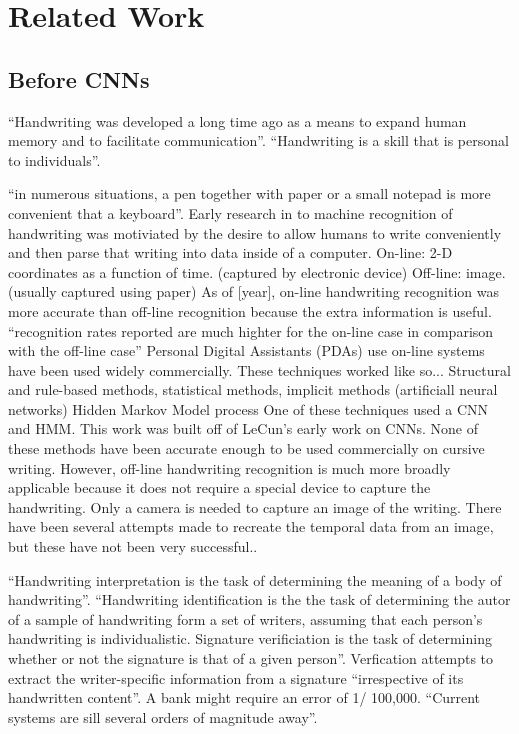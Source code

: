 \section{Related Work}\label{sec:related_work}

\subsection{Before CNNs} %
``Handwriting was developed a long time ago as a means to expand human memory and to facilitate communication''\cite{handwriting_survey}.
``Handwriting is a skill that is personal to individuals''\cite{handwriting_survey}.

``in numerous situations, a pen together with paper or a small notepad is more convenient that a keyboard''\cite{handwriting_survey}.
Early research in to machine recognition of handwriting was motiviated by the desire to allow humans to write conveniently and then parse that writing into data inside of a computer.
On-line: 2-D coordinates as a function of time. (captured by electronic device)
Off-line: image. (usually captured using paper)
\cite{handwriting_survey}
As of [year], on-line handwriting recognition was more accurate than off-line recognition because the extra information is useful.
``recognition rates reported are much highter for the on-line case in comparison with the off-line case''
Personal Digital Assistants (PDAs) use on-line systems have been used widely commercially.
These techniques worked like so...
    Structural and rule-based methods, statistical methods, implicit methods (artificiall neural networks)
    Hidden Markov Model process
One of these techniques used a CNN and HMM\cite{389575}.
This work was built off of LeCun's early work on CNNs.
None of these methods have been accurate enough to be used commercially on cursive writing.
However, off-line handwriting recognition is much more broadly applicable because it does not require a special device to capture the handwriting.
Only a camera is needed to capture an image of the writing.
There have been several attempts made to recreate the temporal data from an image, but these have not been very successful.\cite{handwriting_survey}.

``Handwriting interpretation is the task of determining the meaning of a body of handwriting''\cite{handwriting_survey}.
``Handwriting identification is the the task of determining the autor of a sample of handwriting form a set of writers, assuming that each person's handwriting is individualistic. Signature verificiation is the task of determining whether or not the signature is that of a given person''\cite{handwriting_survey}.
Verfication attempts to extract the writer-specific information from a signature ``irrespective of its handwritten content''.
A bank might require an error of 1/ 100,000. ``Current systems are sill several orders of magnitude away''.

